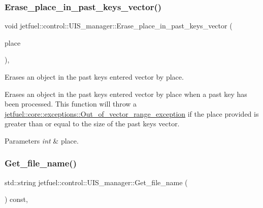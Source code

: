 \subsubsection{\texorpdfstring{Erase\+\_\+place\+\_\+in\+\_\+past\+\_\+keys\+\_\+vector()}{Erase\_place\_in\_past\_keys\_vector()}}
{\footnotesize\ttfamily void jetfuel\+::control\+::\+U\+I\+S\+\_\+manager\+::\+Erase\+\_\+place\+\_\+in\+\_\+past\+\_\+keys\+\_\+vector (\begin{DoxyParamCaption}\item[{const int}]{place }\end{DoxyParamCaption})\hspace{0.3cm}{\ttfamily [inline]}, {\ttfamily [protected]}}



Erases an object in the past keys entered vector by place. 

Erases an object in the past keys entered vector by place when a past key has been processed. This function will throw a \hyperlink{classjetfuel_1_1core_1_1exceptions_1_1Out__of__vector__range__exception}{jetfuel\+::core\+::exceptions\+::\+Out\+\_\+of\+\_\+vector\+\_\+range\+\_\+exception} if the place provided is greater than or equal to the size of the past keys vector.


\begin{DoxyParams}{Parameters}
{\em int} & place. \\
\hline
\end{DoxyParams}
\mbox{\label{classjetfuel_1_1control_1_1UIS__manager_af905f08ba629b3556966f655f24b0b0f}} 
\subsubsection{\texorpdfstring{Get\+\_\+file\+\_\+name()}{Get\_file\_name()}}
{\footnotesize\ttfamily std\+::string jetfuel\+::control\+::\+U\+I\+S\+\_\+manager\+::\+Get\+\_\+file\+\_\+name (\begin{DoxyParamCaption}{ }\end{DoxyParamCaption}) const\hspace{0.3cm}{\ttfamily [inline]}, {\ttfamily [protected]}}



